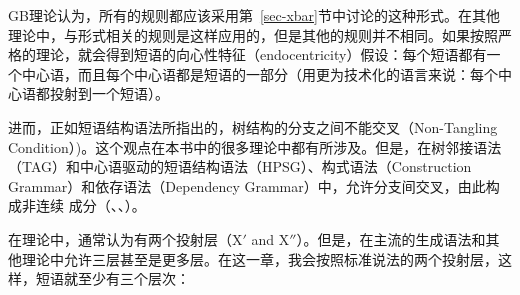 GB理论认为，所有的规则都应该采用第~\ref{sec-xbar}节中讨论的\xbar 这种形式。在其他理论中，与\xbar 形式相关的规则是这样应用的，但是其他的规则并不相同。如果按照严格的\xbar 理论，就会得到短语的向心性特征（endocentricity）假设：每个短语都有一个中心语，而且每个中心语都是短语的一部分（用更为技术化的语言来说：每个中心语都投射到一个短语）。

进而，正如短语结构语法所指出的，树结构的分支之间不能交叉（Non-Tangling Condition）)。这个观点在本书中的很多理论中都有所涉及。但是，在树邻接语法\indextag（TAG）和中心语驱动的短语结构语法\indexhpsg（HPSG）、构式语法\indexcxg（Construction Grammar）和依存语法\indexdg （Dependency Grammar）中，允许分支间交叉，由此构成非连续 成分（\citealp*{BJR91a,Reape94a,BC2005a}、\citealp[]{Heringer96a-u}、\citealp[Section~9.6.2]{Eroms2000a}）。

在\xbar 理论中，通常认为有两个投射层（X$'$ and X$''$）。但是，在主流的生成语法和其他理论中允许三层甚至是更多层\citep{Jackendoff77,Uszkoreit87a}。在这一章，我会按照标准说法的两个投射层，这样，短语就至少有三个层次：

